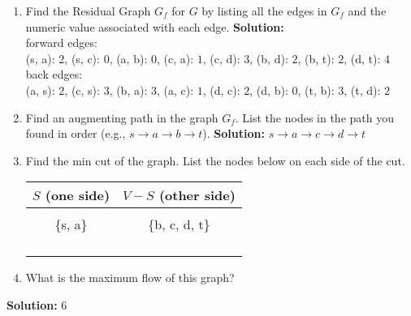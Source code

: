 \documentclass[10pt]{article}
\newcommand{\solution}[1]{\color{blue}\hfill\break\noindent\textbf{Solution:} #1\color{black}}
\begin{document}
\begin{enumerate}
    \item Find the Residual Graph $G_f$ for $G$ by listing all the edges in $G_f$ and the numeric value associated with each edge.
    \solution{ \\
        forward edges: \\
        (s, a): $2$,  (s, c): $0$,  (a, b): $0$,  (c, a): $1$,  (c, d): $3$,  (b, d): $2$,  (b, t): $2$,  (d, t): $4$ \\
        back edges: \\
        (a, s): $2$,  (c, s): $3$,  (b, a): $3$,  (a, c): $1$,  (d, c): $2$,  (d, b): $0$,  (t, b): $3$,  (t, d): $2$ \\
    }

    \item Find an augmenting path in the graph $G_f$.  List the nodes in the path you found in order (e.g., $s \rightarrow a \rightarrow b \rightarrow t$).
    \solution{
        $s \rightarrow a \rightarrow c \rightarrow d \rightarrow t$
    }
    
    
    \item Find the min cut of the graph.  List the nodes below on each side of the cut.
\begin{center}
\begin{tabular}{|c|c|}
     \hline
     \textbf{$S$ (one side)} & \textbf{$V-S$ (other side)}\\
     \hline \hline
     \hspace{2.5in} & \hspace{2.5in} \\
      \{s, a\} & \{b, c, d, t\} \\
      & \\ 
      & \\
      & \\
      & \\
     \hline
\end{tabular}
\end{center}

\item What is the maximum flow of this graph?
\end{enumerate}

\solution{
    6
}
  
\end{document}
